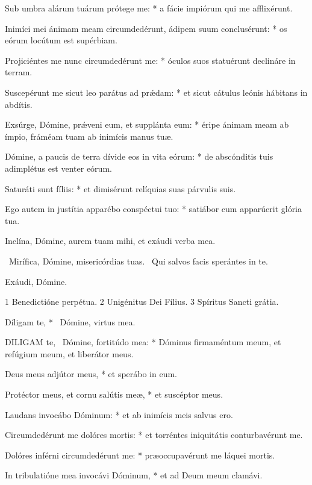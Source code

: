 Sub umbra alárum tuárum prótege me: * a fácie impiórum qui me afflixérunt.

Inimíci mei ánimam meam circumdedérunt, ádipem suum conclusérunt: * os eórum locútum est supérbiam.

Projiciéntes me nunc circumdedérunt me: * óculos suos statuérunt declináre in terram.

Suscepérunt me sicut leo parátus ad prǽdam: * et sicut cátulus leónis hábitans in abdítis.

Exsúrge, Dómine, prǽveni eum, et supplánta eum: * éripe ánimam meam ab ímpio, fráméam tuam ab inimícis manus tuæ.

Dómine, a paucis de terra dívide eos in vita eórum: * de abscónditis tuis adimplétus est venter eórum.

Saturáti sunt fíliis: * et dimisérunt relíquias suas párvulis suis.

Ego autem in justítia apparébo conspéctui tuo: * satiábor cum apparúerit glória tua.

 Inclína, Dómine, aurem tuam mihi, et exáudi verba mea.


\V\ Mirífica, Dómine, misericórdias tuas. \R\ Qui salvos facis sperántes in te.

 Exáudi, Dómine.

 1 Benedictióne perpétua. 2 Unigénitus Dei Fílius. 3 Spíritus Sancti grátia.


 Díligam te, * \textdagger\ Dómine, virtus mea.


\lettrine[lines=2]{D}{ILIGAM} te, \textdagger\ Dómine, fortitúdo mea: * Dóminus firmaméntum meum, et refúgium meum, et liberátor meus.

Deus meus adjútor meus, * et sperábo in eum.

Protéctor meus, et cornu salútis meæ, * et suscéptor meus.

Laudans invocábo Dóminum: * et ab inimícis meis salvus ero.

Circumdedérunt me dolóres mortis: * et torréntes iniquitátis conturbavérunt me.

Dolóres inférni circumdedérunt me: * præoccupavérunt me láquei mortis.

In tribulatióne mea invocávi Dóminum, * et ad Deum meum clamávi.

